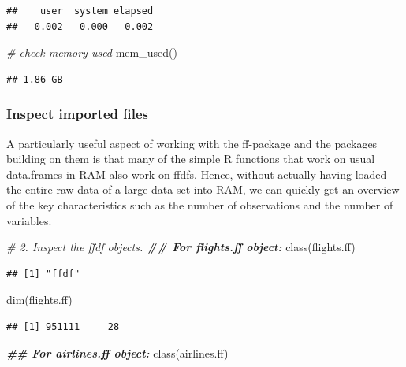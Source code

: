 \documentclass[
  12pt,
]{style/krantz}
\newenvironment{Shaded}{\begin{snugshade}}{\end{snugshade}}
\newcommand{\CommentTok}[1]{\textcolor[rgb]{0.56,0.35,0.01}{\textit{#1}}}
\newcommand{\DocumentationTok}[1]{\textcolor[rgb]{0.56,0.35,0.01}{\textbf{\textit{#1}}}}
\newcommand{\FunctionTok}[1]{\textcolor[rgb]{0.00,0.00,0.00}{#1}}
\newcommand{\NormalTok}[1]{#1}
\begin{document}
\begin{verbatim}
##    user  system elapsed 
##   0.002   0.000   0.002
\end{verbatim}

\begin{Shaded}
\begin{Highlighting}[]
\CommentTok{\# check memory used}
\FunctionTok{mem\_used}\NormalTok{()}
\end{Highlighting}
\end{Shaded}

\begin{verbatim}
## 1.86 GB
\end{verbatim}

\hypertarget{inspect-imported-files}{%
\subsubsection{Inspect imported files}\label{inspect-imported-files}}

A particularly useful aspect of working with the ff-package and the packages building on them is that many of the simple R functions that work on usual data.frames in RAM also work on ffdfs. Hence, without actually having loaded the entire raw data of a large data set into RAM, we can quickly get an overview of the key characteristics such as the number of observations and the number of variables.

\begin{Shaded}
\begin{Highlighting}[]
\CommentTok{\# 2. Inspect the ffdf objects.}
\DocumentationTok{\#\# For flights.ff object:}
\FunctionTok{class}\NormalTok{(flights.ff)}
\end{Highlighting}
\end{Shaded}

\begin{verbatim}
## [1] "ffdf"
\end{verbatim}

\begin{Shaded}
\begin{Highlighting}[]
\FunctionTok{dim}\NormalTok{(flights.ff)}
\end{Highlighting}
\end{Shaded}

\begin{verbatim}
## [1] 951111     28
\end{verbatim}

\begin{Shaded}
\begin{Highlighting}[]
\DocumentationTok{\#\# For airlines.ff object:}
\FunctionTok{class}\NormalTok{(airlines.ff)}
\end{Highlighting}
\end{Shaded}
\end{document}

